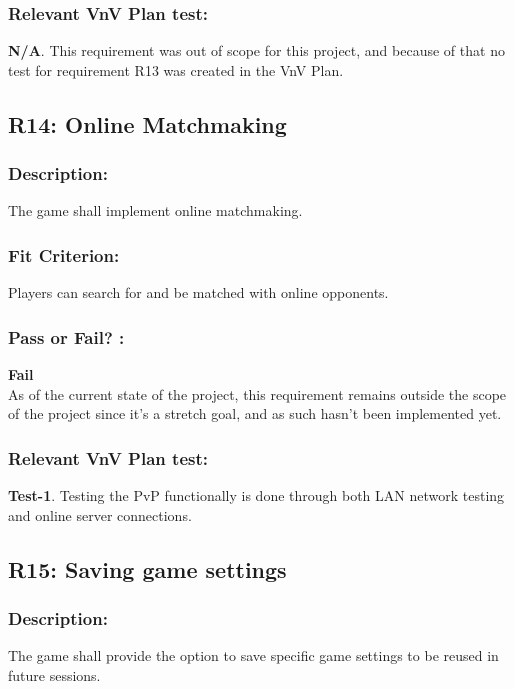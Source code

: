 \documentclass[12pt, titlepage]{article}
\begin{document}
\subsubsection*{Relevant VnV Plan test: } \textbf{N/A}. This requirement was out of scope for this project, and because of that no test for requirement R13 was created in the VnV Plan.


\subsection{R14: Online Matchmaking} 
\label{R14} 

\subsubsection*{Description:}The game shall implement online matchmaking.

\subsubsection*{Fit Criterion:}Players can search for and be matched with online opponents.

\subsubsection*{Pass or Fail? :} 

 \noindent \textbf{Fail}\\
 
 \noindent As of the current state of the project, this requirement remains outside the scope of the project since it's a stretch goal, and as such hasn't been implemented yet. 

\subsubsection*{Relevant VnV Plan test: } \textbf{Test-1}. Testing the PvP functionally is done through both LAN network testing and online server connections.


\subsection{R15: Saving game settings} 
\label{R15} 

\subsubsection*{Description:}The game shall provide the option to save specific game settings to be reused in future sessions.
\end{document}
